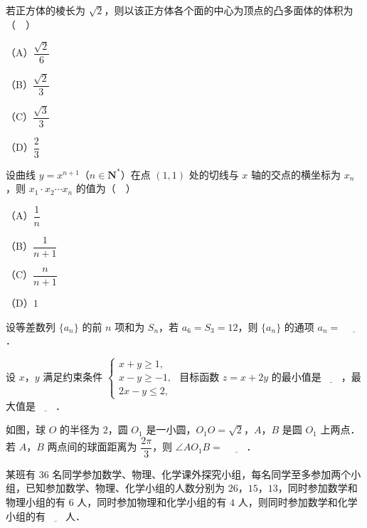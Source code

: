 \begin{question}
若正方体的棱长为 $\sqrt2$，则以该正方体各个面的中心为顶点的凸多面体的体积为（　）

（A）$\dfrac{\sqrt2}6$

（B）$\dfrac{\sqrt2}3$

（C）$\dfrac{\sqrt3}3$

（D）$\dfrac23$

\end{question}
\begin{question}
设曲线 $y=x^{n+1}$（$n\in\mathbf N^*$）在点 $(1,1)$ 处的切线与 $x$ 轴的交点的横坐标为 $x_n$，则 $x_1\cdot x_2\cdots x_n$ 的值为（　）

（A）$\dfrac1n$

（B）$\dfrac1{n+1}$

（C）$\dfrac n{n+1}$

（D）$1$

\end{question}

\begin{question}
设等差数列 $\{a_n\}$ 的前 $n$ 项和为 $S_n$，若 $a_6=S_3=12$，则 $\{a_n\}$ 的通项 $a_n=$ $\underline{\qquad}$．

\end{question}
\begin{question}
设 $x$，$y$ 满足约束条件 $\begin{cases}x+y\geqslant1,\\ x-y\geqslant-1,\\ 2x-y\leqslant2,\end{cases}$ 目标函数 $z=x+2y$ 的最小值是$\underline{\qquad}$，最大值是$\underline{\qquad}$．

\Needspace{0.4\textheight}
\end{question}
\begingroup
\renewenvironment{question}{\Needspace{0.5\textheight}}{}
\begin{question}
如图，球 $O$ 的半径为 $2$，圆 $O_1$ 是一小圆，$O_1O=\sqrt2$，$A$，$B$ 是圆 $O_1$ 上两点．若 $A$，$B$ 两点间的球面距离为 $\dfrac{2\pi}3$，则 $\angle AO_1B=$ $\underline{\qquad}$．
\nopagebreak[4]
\begin{center}\end{center}
\nopagebreak[4]
\end{question}
\endgroup
\begin{question}
某班有 $36$ 名同学参加数学、物理、化学课外探究小组，每名同学至多参加两个小组，已知参加数学、物理、化学小组的人数分别为 $26$，$15$，$13$，同时参加数学和物理小组的有 $6$ 人，同时参加物理和化学小组的有 $4$ 人，则同时参加数学和化学小组的有$\underline{\qquad}$人．

\end{question}

